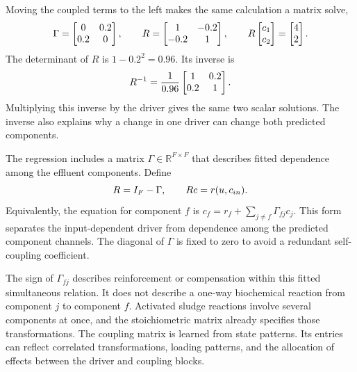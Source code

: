 Moving the coupled terms to the left makes the same calculation a matrix solve,
\begin{equation}
\equationname{Illustrative coupling matrix and coupled-state system}
\label{eq:icsor_small_coupling_matrices}
\Gamma=\begin{bmatrix}0&0.2\\0.2&0\end{bmatrix},
\qquad
R=\begin{bmatrix}1&-0.2\\-0.2&1\end{bmatrix},
\qquad
R\begin{bmatrix}c_1\\c_2\end{bmatrix}=\begin{bmatrix}4\\2\end{bmatrix}.
\end{equation}
The determinant of \(R\) is \(1-0.2^2=0.96\). Its inverse is
\begin{equation}
\equationname{Inverse of the illustrative two-component coupling system}
\label{eq:icsor_small_coupling_inverse}
R^{-1}=\frac{1}{0.96}\begin{bmatrix}1&0.2\\0.2&1\end{bmatrix}.
\end{equation}
Multiplying this inverse by the driver gives the same two scalar solutions. The inverse also explains why a change in one driver can change both predicted components.

The regression includes a matrix \(\Gamma\in\mathbb{R}^{F\times F}\) that describes fitted dependence among the effluent components. Define
\begin{equation}
\equationname{General coupled-state relation and system matrix}
\label{eq:icsor_coupled_relation}
R=I_F-\Gamma,
\qquad Rc=r(u,c_{in}).
\end{equation}
Equivalently, the equation for component \(f\) is \(c_f=r_f+\sum_{j\neq f}\Gamma_{fj}c_j\). This form separates the input-dependent driver from dependence among the predicted component channels. The diagonal of \(\Gamma\) is fixed to zero to avoid a redundant self-coupling coefficient.

The sign of \(\Gamma_{fj}\) describes reinforcement or compensation within this fitted simultaneous relation. It does not describe a one-way biochemical reaction from component \(j\) to component \(f\). Activated sludge reactions involve several components at once, and the stoichiometric matrix already specifies those transformations. The coupling matrix is learned from state patterns. Its entries can reflect correlated transformations, loading patterns, and the allocation of effects between the driver and coupling blocks.

